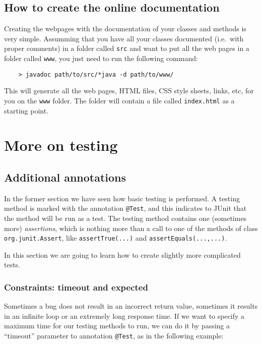 \subsection{How to create the online documentation}
\label{sec:how-create-online}

Creating the webpages with the documentation of your classes and
methods is very simple. Assumming that you have all your classes
documented (i.e.~with proper comments) in a folder called \verb+src+
and want to put all the web pages in a folder called \verb+www+, you
just need to run the following command: 

\begin{verbatim}
    > javadoc path/to/src/*java -d path/to/www/
\end{verbatim}

This will generate all the web pages, HTML files, CSS style sheets,
links, etc, for you on the \verb+www+ folder. The folder will contain
a file called \verb+index.html+ as a starting point. 

\section{More on testing}
\label{sec:more-testing}

\subsection{Additional annotations}
\label{sec:addit-annot}

In the former section we have seen how basic testing is performed. A
testing method is marked with the annotation \verb+@Test+, and this
indicates to JUnit that the method will be run as a test. The testing
method contains one (sometimes more) \emph{assertions}, which is
nothing more than a call to one of the methods of class
\verb+org.junit.Assert+, like \verb+assertTrue(...)+ 
and \verb+assertEquals(...,...)+. 

In this section we are going to learn how to create slightly more
complicated tests. 

\subsubsection*{Constraints: timeout and expected}
\label{sec:timeout}

Sometimes a bug does not result in an incorrect return value,
sometimes it results in an infinite loop or an extremely long response
time. If we want to specify a maximum time for our testing methods to
run, we can do it by passing a ``timeout'' parameter to annotation
\verb+@Test+, as in the following example: 

